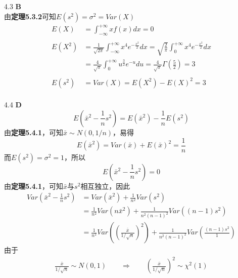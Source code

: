 \documentclass[a4paper]{ctexart}    %
\begin{document}
	4.3 \quad \textbf{B}\\
	由\textbf{定理5.3.2}可知$E(s^2)=\sigma^2=Var(X)$\\
	\begin{equation*}
		\begin{split}
			E(X) &= \int_{-\infty}^{+\infty}xf(x)dx = 0 \\
			&\\
			E(X^2) &= \frac{1}{\sqrt{2\pi}}\int_{-\infty}^{+\infty} x^4e^{-\frac{x^2}{2}}dx=\sqrt{\frac{2}{\pi}}\int_{0}^{+\infty} x^4e^{-\frac{x^2}{2}}dx \\
			&= \frac{4}{\sqrt{\pi}} \int_{0}^{+\infty} u^{\frac{3}{2}}e^{-u}du = \frac{4}{\sqrt{\pi}}\Gamma\left(\frac{5}{2}\right) = 3 \\
			& \\
			E(s^2) &= Var(X) = E(X^2) - E(X)^2 = 3
		\end{split}
	\end{equation*}
	\\
	4.4 \quad \textbf{D} \\
	\begin{equation*}
		E\left(\bar{x}^2 - \frac1n s^2\right) = E(\bar{x}^2) - \frac{1}{n}E(s^2)
	\end{equation*}
	由\textbf{定理5.4.1}，可知$\bar{x}\sim N(0, 1/n)$，易得
	\begin{equation*}
		E(\bar{x}^2) = Var(\bar{x}) + E(\bar{x})^2 = \frac{1}{n}
	\end{equation*}
	而$E(s^2) = \sigma^2 = 1$，所以
	\begin{equation*}
		E\left(\bar{x}^2 - \frac1n s^2\right) = 0
	\end{equation*}
	由\textbf{定理5.4.1}，可知$\bar{x}$与$s^2$相互独立，因此
	\begin{equation*}
		\begin{split}
			Var\left(\bar{x}^2 - \frac{1}{n}s^2 \right) &= Var(\bar{x}^2) + \frac{1}{n^2}Var(s^2) \\
			&= \frac{1}{n^2}Var(n\bar{x}^2) + \frac{1}{n^2(n-1)^2}Var((n-1)s^2) \\
			&= \frac{1}{n^2}Var\left(\left(\frac{\bar{x}}{1/\sqrt{n}}\right)^2\right) + \frac{1}{n^2(n-1)^2} Var\left(\frac{(n-1)s^2}{1}\right)
		\end{split}\tag{$*$}
	\end{equation*}
	由于
	\begin{equation*}
		\begin{split}
			\frac{\bar{x}}{1/\sqrt{n}} \sim N(0,1)\qquad \Rightarrow \qquad \left(\frac{\bar{x}}{1/\sqrt{n}}\right)^2 \sim \chi^2(1)
		\end{split}
	\end{equation*}
\end{document}
